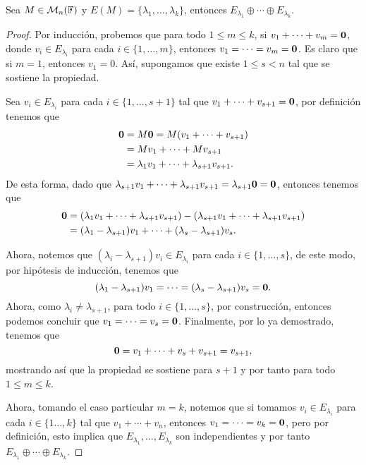 \begin{teor}\label{teor:IndepEP}
  Sea $M \in \mathcal{M}_n(\mathbb{F})$ y $E(M) = \{\lambda_1, \ldots, \lambda_k\}$, entonces $E_{\lambda_1} \oplus \cdots \oplus E_{\lambda_k}$.
\end{teor}
\begin{proof}
  Por inducción, probemos que para todo $1\leq m \leq k$, si $v_1 + \cdots + v_m = \mathbf{0}$, donde $v_i \in E_{\lambda_i}$ para cada $i\in\{1,\ldots,m\}$, entonces $v_1 = \cdots = v_m = \mathbf{0}$. Es claro que si $m = 1$, entonces $v_1 = 0$. Así, supongamos que existe $1 \leq s < n$ tal que se sostiene la propiedad.

  Sea $v_i \in E_{\lambda_i}$ para cada $i\in\{1,\ldots,s+1\}$ tal que $v_1 + \cdots+ v_{s+1} = \mathbf{0}$, por definición tenemos que
  \begin{align*}
    \mathbf{0} &= M\mathbf{0} = M(v_1 + \cdots+ v_{s+1}) \\
      &= Mv_1 + \cdots+ Mv_{s+1} \\
      &= \lambda_1v_1 + \cdots+ \lambda_{s+1}v_{s+1}.
  \end{align*}
  De esta forma, dado que $\lambda_{s+1} v_1 + \cdots+ \lambda_{s+1} v_{s+1} = \lambda_{s+1}\mathbf{0} = \mathbf{0}$, entonces tenemos que 
    \begin{align*}
      \mathbf{0} &= (\lambda_1v_1 + \cdots+ \lambda_{s+1}v_{s+1}) - (\lambda_{s+1} v_1 + \cdots+ \lambda_{s+1} v_{s+1}) \\
        &= (\lambda_1 - \lambda_{s+1})v_1 + \cdots + (\lambda_s - \lambda_{s+1})v_s.
    \end{align*}
  
    Ahora, notemos que $(\lambda_i - \lambda_{s+1})v_{i} \in E_{\lambda_i}$ para cada $i \in \{1,\ldots,s\}$, de este modo, por hipótesis de inducción, tenemos que
      \[ (\lambda_1 - \lambda_{s+1})v_1 = \cdots = (\lambda_s - \lambda_{s+1})v_s = \mathbf{0}.\]
    Ahora, como  $\lambda_i \neq \lambda_{s+1}$, para todo $i \in \{1,\ldots,s\}$, por construcción, entonces podemos concluir que $v_1 = \cdots = v_s = \mathbf{0}$. Finalmente, por lo ya demostrado, tenemos que 
      \[ \mathbf{0} = v_1 + \cdots+ v_s + v_{s+1} = v_{s+1}, \]
    mostrando así que la propiedad se sostiene para $s+1$ y por tanto para todo $1 \leq m \leq k$.

    Ahora, tomando el caso particular $m = k$, notemos que si tomamos $v_i \in E_{\lambda_i}$ para cada $i \in \{1\ldots,k\}$ tal que $v_1 + \cdots + v_n$, entonces $v_1 = \cdots = v_k = \mathbf{0}$, pero por definición, esto implica que $E_{\lambda_1}, \ldots, E_{\lambda_k}$ son independientes y por tanto $E_{\lambda_1} \oplus \cdots \oplus E_{\lambda_k}$.
\end{proof}

